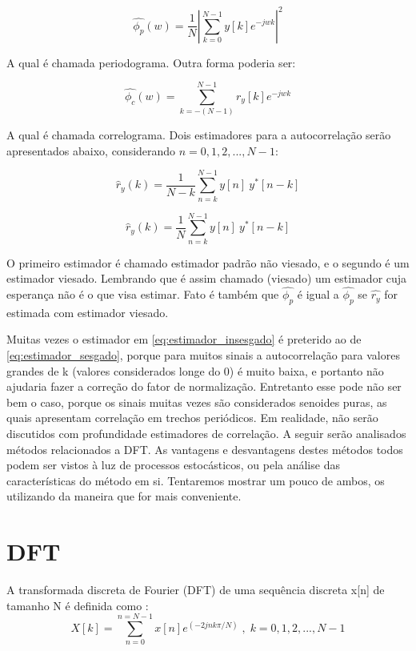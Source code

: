 \begin{equation}
\hat{\phi_p}(w)=\frac{1}{N}  \left|\sum_{k=0}^{N-1}y[k]e^{-jwk}  \right|^2
\end{equation}

A qual é chamada periodograma. Outra forma poderia ser:

\begin{equation}
\hat{\phi_c}(w)=\sum_{k=-(N-1)}^{N-1}r_y[k]e^{-jwk}
\end{equation}

A qual é chamada correlograma. Dois estimadores para a autocorrelação serão apresentados abaixo, considerando $n=0,1,2,..., N-1$:

\begin{equation}
\hat{r}_y(k)=\frac{1}{N-k}\sum_{n=k}^{N-1}y[n] \: y^*[n-k]
\label{eq:estimador_sesgado}
\end{equation}

\begin{equation}
\hat{r}_y(k)=\frac{1}{N}\sum_{n=k}^{N-1}y[n] \: y^*[n-k]
\label{eq:estimador_insesgado}
\end{equation}

O primeiro estimador é chamado estimador padrão não viesado, e o segundo é um estimador viesado. Lembrando que é assim chamado (viesado) um estimador cuja esperança não é o que visa estimar. Fato é também que $\hat{\phi_p}$ é igual a $\hat{\phi_p}$ se $\hat{r_y}$ for estimada com estimador viesado.

\indent Muitas vezes o estimador em \ref{eq:estimador_insesgado} é preterido ao de \ref{eq:estimador_sesgado}, porque para muitos sinais a autocorrelação para valores grandes de k (valores considerados longe do 0) é muito baixa, e portanto não ajudaria fazer a correção do fator de normalização. Entretanto esse pode não ser bem o caso, porque os sinais muitas vezes são considerados senoides puras, as quais apresentam correlação em trechos periódicos. Em realidade, não serão discutidos com profundidade estimadores de correlação. A seguir serão analisados métodos relacionados a DFT. As vantagens e desvantagens destes métodos todos podem ser vistos à luz de processos estocásticos, ou pela análise das características do método em si. Tentaremos mostrar um pouco de ambos, os utilizando da maneira que for mais conveniente. 
\section{DFT}
A transformada discreta de Fourier (DFT) de uma sequência discreta {x[n]} de tamanho N é definida como \cite{mitra2006digital}:
\begin{equation}
X[k]=\sum_{n=0}^{n=N-1} x[n]e^{(-2jnk\pi/N)}\;,\;k=0,1,2,...,N-1
\end{equation}

